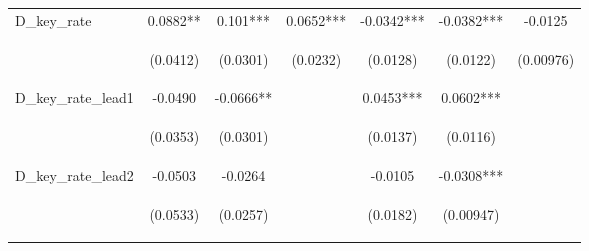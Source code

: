 \documentclass[]{article}
\begin{document}
\begin{center}
\begin{tabular}{lcccccc}
D\_key\_rate & 0.0882** & 0.101*** & 0.0652*** & -0.0342*** & -0.0382*** & -0.0125 \\
\vspace{4pt} & \begin{footnotesize}(0.0412)\end{footnotesize} & \begin{footnotesize}(0.0301)\end{footnotesize} & \begin{footnotesize}(0.0232)\end{footnotesize} & \begin{footnotesize}(0.0128)\end{footnotesize} & \begin{footnotesize}(0.0122)\end{footnotesize} & \begin{footnotesize}(0.00976)\end{footnotesize} \\
D\_key\_rate\_lead1 & -0.0490 & -0.0666** &  & 0.0453*** & 0.0602*** &  \\
\vspace{4pt} & \begin{footnotesize}(0.0353)\end{footnotesize} & \begin{footnotesize}(0.0301)\end{footnotesize} & \begin{footnotesize}\end{footnotesize} & \begin{footnotesize}(0.0137)\end{footnotesize} & \begin{footnotesize}(0.0116)\end{footnotesize} & \begin{footnotesize}\end{footnotesize} \\
D\_key\_rate\_lead2 & -0.0503 & -0.0264 &  & -0.0105 & -0.0308*** &  \\
\vspace{4pt} & \begin{footnotesize}(0.0533)\end{footnotesize} & \begin{footnotesize}(0.0257)\end{footnotesize} & \begin{footnotesize}\end{footnotesize} & \begin{footnotesize}(0.0182)\end{footnotesize} & \begin{footnotesize}(0.00947)\end{footnotesize} & \begin{footnotesize}\end{footnotesize} \\

\end{tabular}
\end{center}
\end{document}
